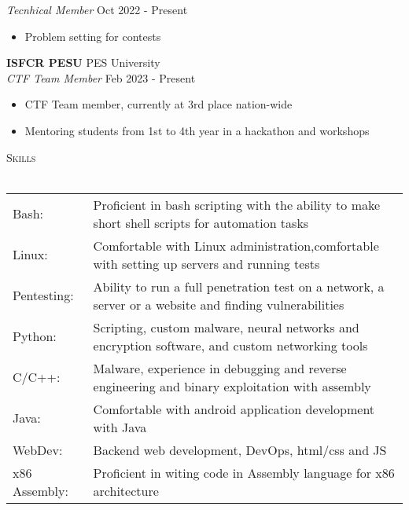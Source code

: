 \documentclass[a4paper]{article}
\newcommand{\lineunder} {
    \vspace*{-8pt} \\
    \hspace*{-18pt} \hrulefill \\
}
\newcommand{\header} [1] {
    {\hspace*{-18pt}\vspace*{6pt} \textsc{#1}}
    \vspace*{-6pt} \lineunder
}
\begin{document}
\textit{Tecnhical Member} \hfill Oct 2022 - Present\\
\vspace{-1mm}
\begin{itemize} \itemsep 1pt
	\item Problem setting for contests
\end{itemize}
\textbf{ISFCR PESU} \hfill PES University\\
\textit{CTF Team Member} \hfill Feb 2023 - Present\\
\vspace{-1mm}
\begin{itemize} \itemsep 1pt
	\item CTF Team member, currently at 3rd place nation-wide
	\item Mentoring students from 1st to 4th year in a hackathon and workshops
\end{itemize}

\header{Skills}
\begin{tabular}{ l l }
	Bash:         & Proficient in bash scripting with the ability to make short shell scripts for automation tasks         \\
	Linux:        & Comfortable with Linux administration,comfortable with setting up servers and running tests            \\
	Pentesting:   & Ability to run a full penetration test on a network, a server or a website and finding vulnerabilities \\
	Python:       & Scripting, custom malware, neural networks and encryption software, and custom networking tools        \\
	C/C++:        & Malware, experience in debugging and reverse engineering and binary exploitation with assembly         \\
	Java:         & Comfortable with android application development with Java                                             \\
	WebDev:       & Backend web development, DevOps, html/css and JS                                                       \\
	x86 Assembly: & Proficient in witing code in Assembly language for x86 architecture                                    \\
\end{tabular}
\vspace{2mm}
\end{document}

